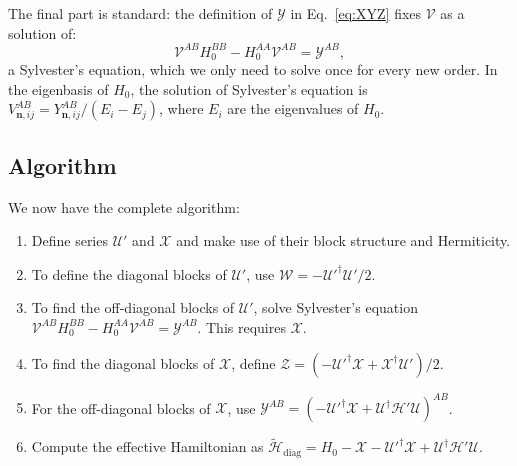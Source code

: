 The final part is standard: the definition of $\mathcal{Y}$ in
Eq.~\eqref{eq:XYZ} fixes $\mathcal{V}$ as a solution of:
%
\begin{equation}
\label{eq:sylvester}
\mathcal{V}^{AB}H_0^{BB} - H_0^{AA} \mathcal{V}^{AB} = \mathcal{Y}^{AB},
\end{equation}
%
a Sylvester's equation, which we only need to solve once for every new order.
In the eigenbasis of $H_0$, the solution of Sylvester's equation is
$V^{AB}_{\mathbf{n}, ij} = Y^{AB}_{\mathbf{n}, ij}/(E_i - E_j)$, where $E_i$
are the eigenvalues of $H_0$.

\subsection{Algorithm}

We now have the complete algorithm:
%
\begin{enumerate}
    \item Define series $\mathcal{U}'$ and $\mathcal{X}$ and make use of their block structure and Hermiticity.
    \item To define the diagonal blocks of $\mathcal{U}'$, use $\mathcal{W} = -\mathcal{U}'^\dagger\mathcal{U}'/2$.
    \item To find the off-diagonal blocks of $\mathcal{U}'$, solve Sylvester's equation $\mathcal{V}^{AB}H_0^{BB} - H_0^{AA}\mathcal{V}^{AB} = \mathcal{Y}^{AB}$.
      This requires $\mathcal{X}$.
    \item To find the diagonal blocks of $\mathcal{X}$, define $\mathcal{Z} = (-\mathcal{U}'^\dagger\mathcal{X} + \mathcal{X}^\dagger\mathcal{U}')/2$.
    \item For the off-diagonal blocks of $\mathcal{X}$, use $\mathcal{Y}^{AB} =
    (-\mathcal{U}'^\dagger\mathcal{X} +
     \mathcal{U}^\dagger\mathcal{H}'\mathcal{U})^{AB}$.
    \item  Compute the effective Hamiltonian as $\tilde{\mathcal{H}}_{\textrm{diag}} = H_0 - \mathcal{X} - \mathcal{U}'^\dagger \mathcal{X} + \mathcal{U}^\dagger\mathcal{H'}\mathcal{U}$.
\end{enumerate}

